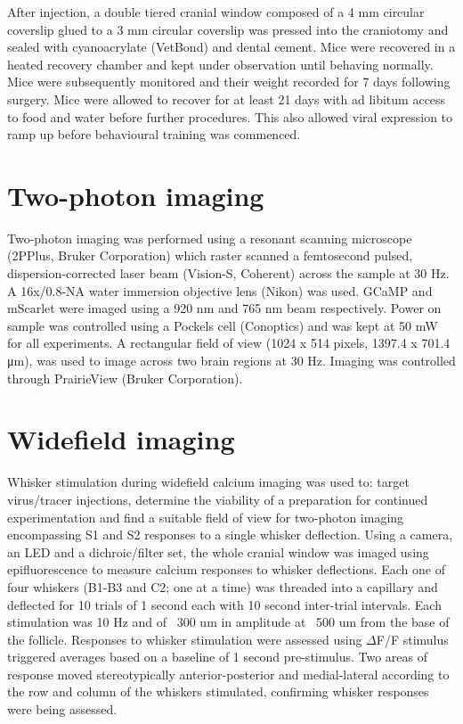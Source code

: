 After injection, a double tiered cranial window composed of a 4 mm circular coverslip glued to a 3 mm circular coverslip was pressed into the craniotomy and sealed with cyanoacrylate (VetBond) and dental cement. Mice were recovered in a heated recovery chamber and kept under observation until behaving normally. Mice were subsequently monitored and their weight recorded for 7 days following surgery. Mice were allowed to recover for at least 21 days with ad libitum access to food and water before further procedures. This also allowed viral expression to ramp up before behavioural training was commenced.

\section{Two-photon imaging}
Two-photon imaging was performed using a resonant scanning microscope (2PPlus, Bruker Corporation) which raster scanned a femtosecond pulsed, dispersion-corrected laser beam (Vision-S, Coherent) across the sample at 30 Hz. A 16x/0.8-NA water immersion objective lens (Nikon) was used. GCaMP and mScarlet were imaged using a 920 nm and 765 nm beam respectively. Power on sample was controlled using a Pockels cell (Conoptics) and was kept at 50 mW for all experiments. A rectangular field of view (1024 x 514 pixels, 1397.4 x 701.4 μm), was used to image across two brain regions at 30 Hz. Imaging was controlled through PrairieView (Bruker Corporation).

\section{Widefield imaging}

Whisker stimulation during widefield calcium imaging was used to: target virus/tracer injections, determine the viability of a preparation for continued experimentation and find a suitable field of view for two-photon imaging encompassing S1 and S2 responses to a single whisker deflection. Using a camera, an LED and a dichroic/filter set, the whole cranial window was imaged using epifluorescence to measure calcium responses to whisker deflections. Each one of four whiskers (B1-B3 and C2; one at a time) was threaded into a capillary and deflected for 10 trials of 1 second each with 10 second inter-trial intervals. Each stimulation was 10 Hz and of ~300 um in amplitude at ~500 um from the base of the follicle. Responses to whisker stimulation were assessed using $\Delta$F/F stimulus triggered averages based on a baseline of 1 second pre-stimulus. Two areas of response moved stereotypically anterior-posterior and medial-lateral according to the row and column of the whiskers stimulated, confirming whisker responses were being assessed.

